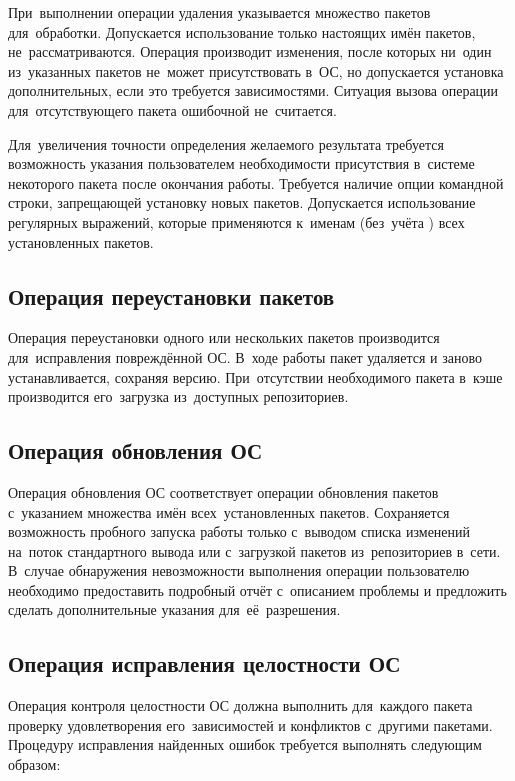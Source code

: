 При~выполнении операции удаления указывается множество пакетов для~обработки.
Допускается использование только настоящих имён пакетов,  не~рассматриваются.
Операция производит изменения, после которых ни~один из~указанных пакетов не~может присутствовать в~ОС,
но допускается установка дополнительных, если это требуется зависимостями. 
Ситуация вызова операции для~отсутствующего пакета ошибочной не~считается.

Для~увеличения точности определения желаемого результата требуется возможность указания пользователем 
необходимости  присутствия в~системе некоторого пакета после окончания работы.
Требуется наличие опции командной строки, запрещающей установку новых пакетов. 
Допускается использование регулярных выражений,
которые применяются к~именам (без~учёта ) всех установленных пакетов.

\subsection{Операция переустановки пакетов}

Операция переустановки одного или нескольких пакетов производится для~исправления повреждённой ОС.
В~ходе работы пакет удаляется и заново устанавливается, сохраняя версию.
При~отсутствии необходимого пакета в~кэше производится  его~загрузка из~доступных репозиториев.

\subsection{Операция обновления ОС}

Операция обновления ОС соответствует операции обновления пакетов с~указанием множества имён всех~установленных пакетов.
Сохраняется возможность пробного запуска работы только с~выводом списка изменений на~поток стандартного вывода или с~загрузкой пакетов из~репозиториев в~сети.
В~случае обнаружения невозможности выполнения операции пользователю необходимо предоставить подробный отчёт с~описанием проблемы и предложить сделать дополнительные указания для~её~разрешения.

\subsection{Операция исправления целостности ОС}

Операция контроля целостности ОС должна выполнить  для~каждого пакета  проверку удовлетворения его~зависимостей и конфликтов с~другими пакетами.
Процедуру исправления найденных ошибок требуется выполнять следующим образом:

